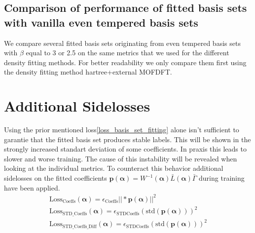  \subsection{Comparison of performance of fitted basis sets with vanilla even tempered basis sets}
 We compare several fitted basis sets originating from even tempered basis sets with $\beta$ equal to 3 or 2.5 on the same metrics that we used for the different density fitting methods. For better readability we only compare them first using the density fitting method hartree+external MOFDFT.
 \section{Additional Sidelosses}
 Using the prior mentioned loss\ref{loss_basis_set_fitting} alone isn't sufficient to garantie that the fitted basis set produces stable labels. This will be shown in the strongly increased standart deviation of some coefficients. In praxis this leads to slower and worse training. The cause of this instability will be revealed when looking at the individual metrics.
 To counteract this behavior additional sidelosses on the fitted coefficients $\mathbf{p}(\mathbf{\alpha}) = W^{-1}(\mathbf{\alpha}) \bar L(\mathbf{\alpha}) \bar \Gamma$ during training have been applied.
 \begin{align}
    \text{Loss}_\text{Coeffs}(\mathbf{\alpha}) = \epsilon_\text{Coeffs}||*\mathbf{p}(\mathbf{\alpha})||^2\\
    \text{Loss}_\text{STD\_Coeffs}(\mathbf{\alpha}) = \epsilon_\text{STDCoeffs}\left(\text{std}(\mathbf{p}(\mathbf{\alpha}))\right)^2\\
    \text{Loss}_\text{STD\_Coeffs\_Diff}(\mathbf{\alpha}) = \epsilon_\text{STDCoeffs}\left(\text{std}(\mathbf{p}(\mathbf{\alpha}))\right)^2\\
 \end{align}
